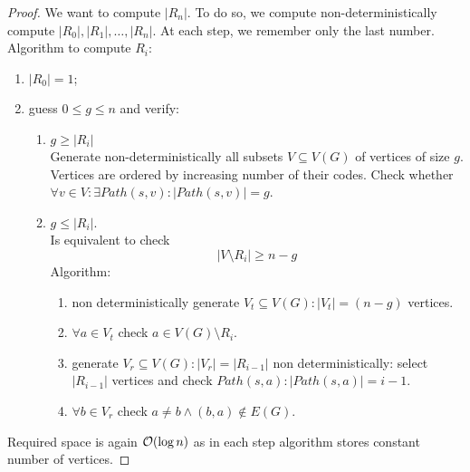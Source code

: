\begin{proof}
	We want to compute $|R_n|$.
	To do so, we compute non-deterministically compute $|R_0|, |R_1|, \ldots, |R_n|$.
	At each step, we remember only the last number.
	Algorithm to compute $R_i$:
	\begin{enumerate}
		\item $|R_0| = 1$;
		\item guess $0 \leq g \leq n$ and verify:
			\begin{enumerate}
				\item $g \geq |R_i|$\\
					Generate non-deterministically all subsets $V \subseteq V(G)$ of vertices of size $g$.
					Vertices are ordered by increasing number of their codes.
					Check whether $\forall v \in V: \exists Path(s, v): |Path(s, v)| = g$.
				\item $g \leq |R_i|$.\\
					Is equivalent to check
					\[ |V \setminus R_i| \geq n - g \]
					Algorithm:
					\begin{enumerate}
						\item non deterministically generate $V_t \subseteq V(G): |V_t| = (n - g)$ vertices.
						\item $\forall a \in V_t$ check $a \in V(G) \setminus R_i$.
						\item generate $V_r \subseteq V(G): |V_r| = |R_{i - 1}|$ non deterministically: select $|R_{i - 1}|$ vertices and check $Path(s, a): |Path(s, a)| = i - 1$.
						\item $\forall b \in V_r$ check $a \ne b \land (b, a) \notin E(G)$.
					\end{enumerate}
			\end{enumerate}
	\end{enumerate}

	Required space is again $\mathcal{O}(\log n)$ as in each step algorithm stores constant number of vertices.
\end{proof}
